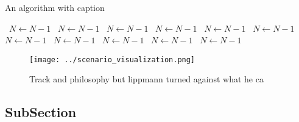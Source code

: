 \documentclass[a4paper]{article}
\begin{document}
\begin{algorithm}
\caption{An algorithm with caption}
\begin{algorithmic}
\    \State $N \gets N - 1$
\    \State $N \gets N - 1$
\    \State $N \gets N - 1$
\    \State $N \gets N - 1$
\    \State $N \gets N - 1$
\    \State $N \gets N - 1$
\    \State $N \gets N - 1$
\    \State $N \gets N - 1$
\    \State $N \gets N - 1$
\    \State $N \gets N - 1$
\    \State $N \gets N - 1$
\EndWhile
\end{algorithmic}
\end{algorithm}

\begin{figure}
\centering
\texttt{[image: ../scenario\_visualization.png]}
\caption{Track and philosophy but lippmann turned against what he ca
}
\end{figure}
 
\subsection{SubSection}
\end{document}
